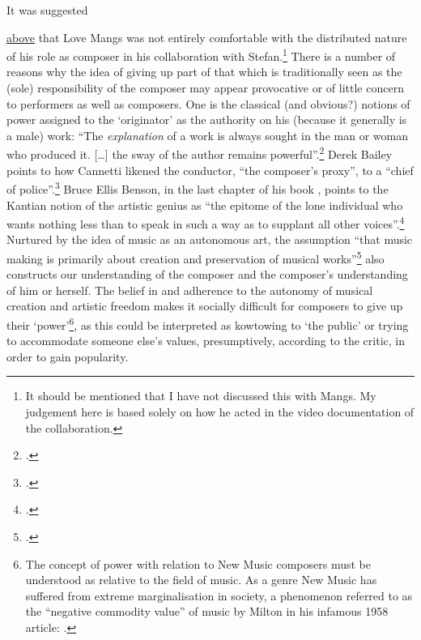 \hypertarget{sec:target:negotiating-2-1}{It was suggested} \hyperref[sec:negotiating-1]{above} that Love Mangs was not entirely comfortable with the distributed nature of his role as composer in his collaboration with Stefan.\footnote{It should be mentioned that I have not discussed this with Mangs. My judgement here is based solely on how he acted in the video documentation of the collaboration.} There is a number of reasons why the idea of giving up part of that which is traditionally seen as the (sole) responsibility of the composer may appear provocative or of little concern to performers as well as composers. One is the classical (and obvious?) notions of power assigned to the `originator' as the authority on his (because it generally is a male) work: ``The \emph{explanation} of a work is always sought in the man or woman who produced it. [\ldots] the sway of the author remains powerful''.\footcite[143]{barthes68} Derek Bailey points to how Cannetti likened the conductor, ``the composer's proxy'', to a ``chief of police''.\footcite[Elias Canetti, \emph{Crowds and Power}. Citations from][20]{bailey92} Bruce Ellis Benson, in the last chapter of his book , points to the Kantian notion of the artistic genius as ``the epitome of the lone individual who wants nothing less than to speak in such a way as to supplant all other voices''.\footcite[164]{benson03} Nurtured by the idea of music as an autonomous art, the assumption ``that music making is primarily about creation and preservation of musical works''\footcite{benson03} also constructs our understanding of the composer and the composer's understanding of him or herself. The belief in and adherence to the autonomy of musical creation and artistic freedom makes it socially difficult for composers to give up their `power'\footnote{The concept of power with relation to New Music composers must be understood as relative to the field of music. As a genre New Music has suffered from extreme marginalisation in society, a phenomenon  referred to as the ``negative commodity value'' of music by Milton \citeauthor{babbitt58} in his infamous 1958 article: \cite{babbitt58}.}, as this could be interpreted as kowtowing to `the public' or trying to accommodate someone else's values, presumptively, according to the critic, in order to gain popularity. 

